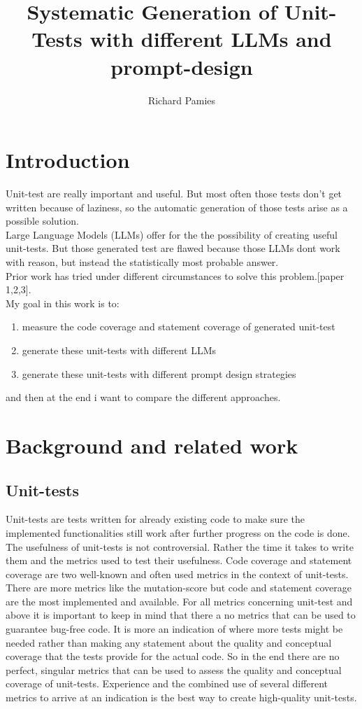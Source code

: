 \documentclass[a4paper,11pt,oneside]{memoir}
\title{Systematic Generation of Unit-Tests with different LLMs and prompt-design}
\author{Richard Pamies}
\begin{document}
\frontmatter

\smarttitle

\newpage
\tableofcontents

\mainmatter

\chapter{Introduction}
Unit-test are really important and useful. But most often those tests don't get written because of laziness, so the automatic generation of those tests arise as a possible solution.
\\
Large Language Models (LLMs) offer for the the possibility of creating useful unit-tests. But those generated test are flawed because those LLMs dont work with reason, but instead the statistically most probable answer.
\\
Prior work  has tried under different circumstances to solve this problem.[paper 1,2,3].
\\
My goal in this work is to:\\
\begin{enumerate}
\item measure the code coverage and statement coverage of generated unit-test
\item generate these unit-tests with different LLMs
\item generate these unit-tests with different prompt design strategies
\end{enumerate}
and then at the end i want to compare the different approaches.

\chapter{Background and related work}
\section{Unit-tests}
Unit-tests are tests written for already existing code to make sure the implemented functionalities still work after further progress on the code is done. The usefulness of unit-tests is not controversial. Rather the time it takes to write them and the metrics used to test their usefulness. 
Code coverage and statement coverage are two well-known and often used metrics in the context of unit-tests. There are more metrics like the mutation-score but code and statement coverage are the most implemented and available.
For all metrics concerning unit-test and above it is important to keep in mind that there a no metrics that can be used to guarantee bug-free code. It is more an indication of where more tests might be needed rather than making any statement about the quality and conceptual coverage that the tests provide for the actual code.
So in the end there are no perfect, singular metrics that can be used to assess the quality and conceptual coverage of unit-tests. Experience and the combined use of several different metrics to arrive at an indication is the best way to create high-quality unit-tests.
\end{document}
